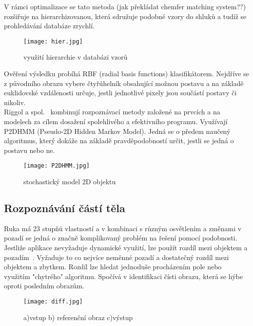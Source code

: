 V rámci optimalizace se tato metoda (jak překládat chemfer matching system??) rozšiřuje na hierarchizovanou, která sdružuje podobné vzory do shluků a tudíž se prohledávání databáze zrychlí.
\begin{figure}[h]
\centering
\texttt{[image: hier.jpg]}
\caption{využití hierarchie v databázi vzorů~\cite{7} }
\end{figure}

Ověření výsledku probíhá RBF (radial basis functions) klasifikátorem. Nejdříve se z původního obrazu vybere čtyřúhelník obsahující možnou postavu a na základě euklidovské vzdálenosti určuje, jestli jednotlivé pixely jsou součástí postavy či nikoliv.\\

Riggol a spol.~\cite{11} kombinují rozpoznávací metody založené na prvcích a na modelech za cílem dosažení spolehlivého a efektivního programu. Využívají P2DHMM (Pseudo-2D Hidden Markov Model). Jedná se o předem naučený algoritmus, který dokáže na základě pravděpodobností určit, jestli se jedná o postavu nebo ne.\\
\begin{figure}[h]
\centering
\texttt{[image: P2DHMM.jpg]}
\caption{stochastický model 2D objektu ~\cite{11} } %
\end{figure}


\subsection{Rozpoznávání částí těla}
Ruka má 23 stupňů vlastností a v kombinaci s různým osvětlením a změnami v pozadí se jedná o značně komplikovaný problém na řešení pomocí podobnosti.\\

Jestliže aplikace nevyžaduje dynamické využití, lze použít rozdíl mezi objektem a pozadím~\cite{14}. Vyžaduje to co nejvíce neměnné pozadí a dostatečný rozdíl mezi objektem a zbytkem. Rozdíl lze hledat jednoduše procházením pole nebo využitím "chytrého" algoritmu. Spočívá v identifikaci čísti obrazu, která se hýbe oproti posledním obrazům.
\begin{figure}[h]
\centering
\texttt{[image: diff.jpg]}
\caption{a)vstup  b) referenční obraz  c)výstup ~\cite{14} } 
\end{figure}


